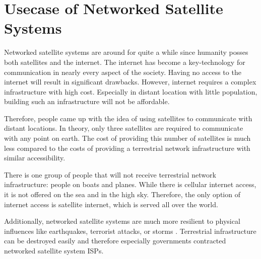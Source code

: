 \section{Usecase of Networked Satellite Systems} \label{sec:usecase-networked-satellite-systems}

Networked satellite systems are around for quite a while since humanity posses both satellites and the internet.
The internet has become a key-technology for communication in nearly every aspect of the society.
Having no access to the internet will result in significant drawbacks.
However, internet requires a complex infrastructure with high cost. Especially in distant location with little population, building such an infrastructure will not be affordable.

Therefore, people came up with the idea of using satellites to communicate with distant locations.
In theory, only three satellites are required to communicate with any point on earth.
The cost of providing this number of satellites is much less compared to the costs of providing a terrestrial network infrastructure with similar accessibility.

There is one group of people that will not receive terrestrial network infrastructure: people on boats and planes.
While there is cellular internet access, it is not offered on the sea and in the high sky.
Therefore, the only option of internet access is satellite internet, which is served all over the world.

Additionally, networked satellite systems are much more resilient to physical influences like earthquakes, terrorist attacks, or storms \cite{DBLP:conf/pam/StevensIBD24}.
Terrestrial infrastructure can be destroyed easily and therefore especially governments contracted networked satellite system ISPs.


